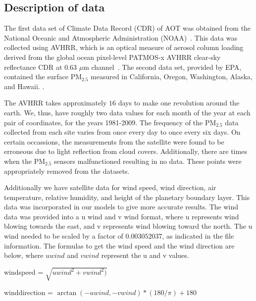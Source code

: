 \documentclass[10pt]{article}
\newcommand{\kelly}[1]{{\color{blue}{Kelly: {#1}}}}
\begin{document}
\subsection{Description of data}

The first data set of Climate Data Record (CDR) of AOT was obtained from the National Oceanic and Atmospheric Administration (NOAA)~\cite{noaa}. \kelly{what does this next sentence mean???} This data was collected using AVHRR, which is an optical measure of aerosol column loading derived from the global ocean pixel-level PATMOS-x AVHRR clear-sky reflectance CDR at $0.63$ $\mu$m channel~\cite{noaa}. %
The second data set, provided by EPA, contained the surface PM$_{2.5}$ measured in California, Oregon, Washington, Alaska, and Hawaii.  \cite{epa}.

The AVHRR takes approximately $16$ days to make one revolution around the earth. We, thus, have roughly two data values for each month of the year at each pair of coordinates, for the years 1981-2009. The frequency of the PM$_{2.5}$ data collected from each site varies from once every day to once every six days. On certain occassions, the measurements from the satellite were found to be  erroneous due to light reflection from cloud covers. Additionally, there are times when the PM$_{2.5}$ sensors malfunctioned resulting in no data. These points were appropriately removed from the datasets. %

Additionally we have satellite data for wind speed, wind direction, air temperature, relative humidity, and  height of the planetary boundary layer. This data was incorporated in our models to give more accurate results. The wind data was provided into a u wind and v wind format, where u represents wind blowing towards the east, and v represents wind blowing toward the north. The u wind needed to be scaled by a factor of $0.003052037$, as indicated in the file information. The formulas to get the wind speed and the wind direction are below, where $uwind$ and $vwind$ represent the u and v values. \cite{wind}

\begin{center}
windspeed = $\sqrt{uwind^2 + vwind^2)}$

\bigskip

winddirection = $\arctan(-uwind, -vwind) * (180/\pi) + 180$

\end{center}
\end{document}
